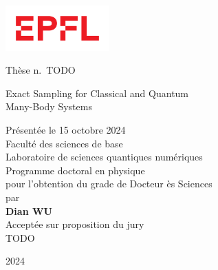 
\begin{titlepage}
\begin{otherlanguage}{french}

\sffamily

\begin{flushleft}
\parbox{0.3\textwidth}{\includegraphics[width=4cm]{images/epfl}}
\end{flushleft}

\begin{flushright}
Thèse n.~TODO
\end{flushright}

\null\vspace{2cm}

\begin{minipage}{4cm}
\end{minipage}
\hfill
\begin{minipage}{11cm}
{\Large Exact Sampling for Classical and Quantum \\[8pt] Many-Body Systems} \\

\vspace{2cm}

\small
Présentée le 15 octobre 2024 \\[8pt]
Faculté des sciences de base \\
Laboratoire de sciences quantiques numériques \\
Programme doctoral en physique \\

pour l'obtention du grade de Docteur ès Sciences \\[8pt]
par \\ [12pt]
{\Large \textbf{Dian WU}} \\[9pt]

Acceptée sur proposition du jury \\[4pt]
TODO
\end{minipage}
\vspace{2cm}
\begin{flushright}
2024
\end{flushright}

\end{otherlanguage}
\end{titlepage}
